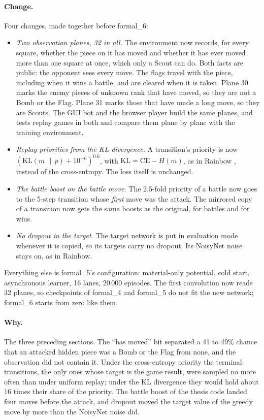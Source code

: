 \paragraph{Change.} Four changes, made together before formal\_6:
\begin{itemize}
  \item \emph{Two observation planes, 32 in all.} The environment now records, for every square,
        whether the piece on it has moved and whether it has ever moved more than one square at
        once, which only a Scout can do. Both facts are public: the opponent sees every move. The
        flags travel with the piece, including when it wins a battle, and are cleared when it is
        taken. Plane 30 marks the enemy pieces of unknown rank that have moved, so they are not a
        Bomb or the Flag. Plane 31 marks those that have made a long move, so they are Scouts.
        The GUI bot and the browser player build the same planes, and tests replay games in both
        and compare them plane by plane with the training environment.
  \item \emph{Replay priorities from the KL divergence.} A transition's priority is now
        $(\mathrm{KL}(m \,\|\, p) + 10^{-6})^{0.6}$, with
        $\mathrm{KL} = \mathrm{CE} - H(m)$, as in Rainbow \cite{RainbowJMLR2021}, instead of the
        cross-entropy. The loss itself is unchanged.
  \item \emph{The battle boost on the battle move.} The 2.5-fold priority of a battle now goes to
        the 5-step transition whose \emph{first} move was the attack. The mirrored copy of a
        transition now gets the same boosts as the original, for battles and for wins.
  \item \emph{No dropout in the target.} The target network is put in evaluation mode whenever
        it is copied, so its targets carry no dropout. Its NoisyNet noise stays on, as in
        Rainbow.
\end{itemize}
Everything else is formal\_5's configuration: material-only potential, cold start, asynchronous
learner, 16 lanes, 20\,000 episodes. The first convolution now reads 32 planes, so checkpoints of
formal\_4 and formal\_5 do not fit the new network; formal\_6 starts from zero like them.

\paragraph{Why.} The three preceding sections. The ``has moved'' bit separated a 41 to 49\% chance
that an attacked hidden piece was a Bomb or the Flag from none, and the observation did not contain
it. Under the cross-entropy priority the terminal transitions, the only ones whose target is the
game result, were sampled no more often than under uniform replay; under the KL divergence they
would hold about 16 times their share of the priority. The battle boost of the thesis code
landed four moves before the attack, and dropout moved the target value of the greedy move by
more than the NoisyNet noise did.


